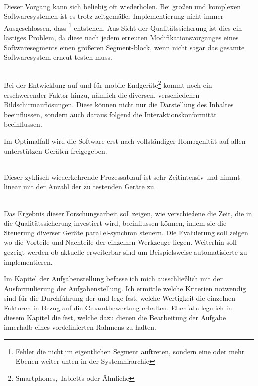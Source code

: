 \\Dieser Vorgang kann sich beliebig oft wiederholen. Bei großen und komplexen Softwaresystemen ist es trotz zeitgemäßer Implementierung nicht immer Ausgeschlossen, dass \footnote{Fehler die nicht im eigentlichen Segment auftreten, sondern eine oder mehr Ebenen weiter unten in der Systemhirarchie} entstehen. Aus Sicht der Qualitätssicherung ist dies ein lästiges Problem, da diese nach jedem erneuten Modifikationsvorganges eines Softwaresegments einen größeren Segment-block, wenn nicht sogar das gesamte Softwaresystem erneut testen muss.

\\Bei der Entwicklung auf und für mobile Endgeräte\footnote{Smartphones, Tabletts  oder Ähnliche} kommt noch ein erschwerender Faktor hinzu, nämlich die diversen, verschiedenen Bildschirmauflösungen. Diese können nicht nur die Darstellung des Inhaltes beeinflussen, sondern auch daraus folgend die Interaktionskonformität beeinflussen.


Im Optimalfall wird die Software erst nach vollständiger Homogenität auf allen unterstützen Geräten freigegeben.

\\Dieser zyklisch wiederkehrende Prozessablauf ist sehr Zeitintensiv und nimmt linear mit der Anzahl der zu testenden Geräte zu.

\\Das Ergebnis dieser Forschungsarbeit soll zeigen, wie verschiedene  die Zeit, die in die Qualitätssicherung investiert wird, beeinflussen können, indem sie die Steuerung diverser Geräte parallel-synchron steuern. Die Evaluierung soll zeigen wo die Vorteile und Nachteile der einzelnen Werkzeuge liegen. Weiterhin soll gezeigt werden ob aktuelle  erweiterbar sind um Beispielsweise automatisierte  zu implementieren. 

\pagebreak
Im Kapitel der Aufgabenstellung befasse ich mich ausschließlich mit der Ausformulierung der Aufgabenstellung. Ich ermittle welche Kriterien notwendig sind für die Durchführung der  und lege fest, welche Wertigkeit die einzelnen Faktoren in Bezug auf die Gesamtbewertung erhalten. Ebenfalls lege ich in diesem Kapitel die  fest, welche dazu dienen die Bearbeitung der Aufgabe innerhalb eines vordefinierten Rahmens zu halten.

